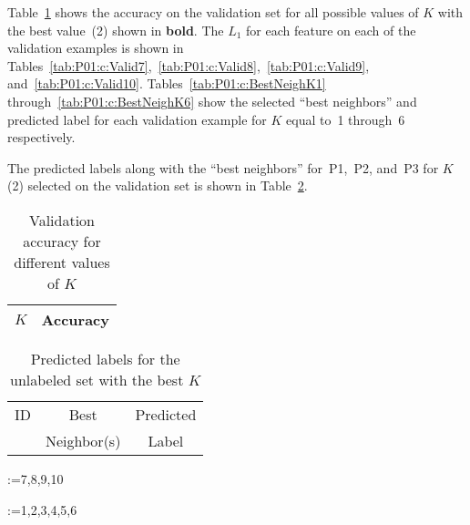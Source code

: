 Table~\ref{tab:P01:c:AccVsK} shows the accuracy on the validation set for all possible values of $K$ with the best value~(2) shown in \textbf{bold}.  The $L_1$ for each feature on each of the validation examples is shown in Tables~\ref{tab:P01:c:Valid7},~\ref{tab:P01:c:Valid8},~\ref{tab:P01:c:Valid9}, and~\ref{tab:P01:c:Valid10}.  Tables~\ref{tab:P01:c:BestNeighK1} through~\ref{tab:P01:c:BestNeighK6} show the selected ``best neighbors'' and predicted label for each validation example for $K$ equal to~1 through~6 respectively.

The predicted labels along with the ``best neighbors'' for~P1,~P2, and~P3 for $K$ (2) selected on the validation set is shown in Table~\ref{tab:P01:c:UnlabelBestK}.

\begin{table}[h]
  \centering
  \caption{Validation accuracy for different values of $K$}\label{tab:P01:c:AccVsK}
  \begin{tabular}{|c|c|}
    \hline
    $K$ & Accuracy \\\hline\hline
    
  \end{tabular}
\end{table}

\begin{table}[h]
  \centering
  \caption{Predicted labels for the unlabeled set with the best $K$}\label{tab:P01:c:UnlabelBestK}
  \begin{tabular}{|c||c|c|}
    \hline
    ID & Best        & Predicted \\
       & Neighbor(s) & Label  \\\hline\hline
    
  \end{tabular}
\end{table}

\@for\id:={7,8,9,10}

\@for\id:={1,2,3,4,5,6}
